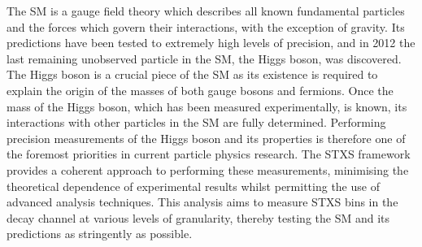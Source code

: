 The SM is a gauge field theory which describes all known fundamental particles 
and the forces which govern their interactions, with the exception of gravity.
Its predictions have been tested to extremely high levels of precision, 
and in 2012 the last remaining unobserved particle in the SM, the Higgs boson, was discovered.
The Higgs boson is a crucial piece of the SM as its existence is required to explain the origin
of the masses of both gauge bosons and fermions.
Once the mass of the Higgs boson, which has been measured experimentally, is known, 
its interactions with other particles in the SM are fully determined.
Performing precision measurements of the Higgs boson and its properties is therefore 
one of the foremost priorities in current particle physics research.
The STXS framework provides a coherent approach to performing 
these measurements, minimising the theoretical dependence of experimental results
whilst permitting the use of advanced analysis techniques.
This analysis aims to measure STXS bins in the \Hgg decay channel at various levels of granularity, 
thereby testing the SM and its predictions as stringently as possible.
